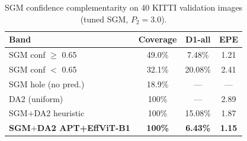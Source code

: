 \begin{table}[t]
\caption{SGM confidence complementarity on 40 KITTI validation images (tuned SGM, $P_2{=}3.0$).}
\label{tab:complementarity}
\centering
\footnotesize
\begin{tabular}{@{}lccc@{}}
\toprule
\textbf{Band} & \textbf{Coverage} & \textbf{D1-all} & \textbf{EPE} \\
\midrule
SGM conf $\geq$ 0.65   & 49.0\% & 7.48\%          & 1.21 \\
SGM conf $<$ 0.65      & 32.1\% & 20.08\%         & 2.41 \\
SGM hole (no pred.)    & 18.9\% & ---             & --- \\
\midrule
DA2 (uniform)          & 100\%  & ---             & 2.89 \\
SGM$+$DA2 heuristic    & 100\%  & 15.08\%         & 1.87 \\
\textbf{SGM$+$DA2 APT+EffViT-B1} & \textbf{100\%} & \textbf{6.43\%} & \textbf{1.15} \\
\bottomrule
\end{tabular}
\end{table}
